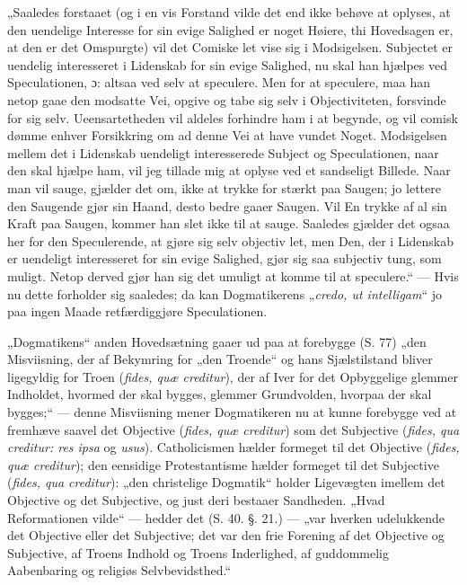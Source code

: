 „Saaledes forstaaet (og i en vis Forstand vilde det end ikke
behøve at oplyses, at den uendelige Interesse for sin evige
Salighed er noget Høiere, thi Hovedsagen er, at den er det
Omspurgte) vil det Comiske let vise sig i Modsigelsen. Subjectet
er uendelig interesseret i Lidenskab for sin evige Salighed, nu
skal han hjælpes ved Speculationen, ɔ: altsaa ved selv at
speculere. Men for at speculere, maa han netop gaae den modsatte
Vei, opgive og tabe sig selv i Objectiviteten, forsvinde for sig
selv. Ueensartetheden vil aldeles forhindre ham i at begynde, og
vil comisk dømme enhver Forsikkring om ad denne Vei at have vundet
Noget. Modsigelsen mellem det i Lidenskab uendeligt interesserede
Subject og Speculationen, naar den skal hjælpe ham, vil jeg
tillade mig at oplyse ved et sandseligt Billede. Naar man vil
sauge, gjælder det om, ikke at trykke for stærkt paa Saugen; jo
lettere den Saugende gjør sin Haand, desto bedre gaaer Saugen. Vil
En trykke af al sin Kraft
 paa Saugen, kommer han slet ikke til at sauge. Saaledes gjælder
det ogsaa her for den Speculerende, at gjøre sig selv objectiv
let, men Den, der i Lidenskab er uendeligt interesseret for sin
evige Salighed, gjør sig saa subjectiv tung, som muligt. Netop
derved gjør han sig det umuligt at komme til at speculere.“ ---
Hvis nu dette forholder sig saaledes; da kan Dogmatikerens
„\textit{credo, ut intelligam}“ jo paa ingen Maade retfærdiggjøre
Speculationen.

„Dogmatikens“ anden Hovedsætning gaaer ud paa at forebygge (S. 77)
„den Misviisning, der af Bekymring for „den Troende“ og hans
Sjælstilstand bliver ligegyldig for Troen (\textit{fides, quæ
creditur}), der af Iver for det Opbyggelige glemmer Indholdet,
hvormed der skal bygges, glemmer Grundvolden, hvorpaa der skal
bygges;“ --- denne Misviisning mener Dogmatikeren nu at kunne
forebygge ved at fremhæve saavel det Objective (\textit{fides,
quæ creditur}) som det Subjective (\textit{fides, qua creditur:
res ipsa} og \textit{usus}). Catholicismen hælder formeget til det
Objective (\textit{fides, quæ creditur}); den eensidige
Protestantisme hælder formeget til det Subjective (\textit{fides,
qua creditur}): „den christelige Dogmatik“ holder Ligevægten
imellem det Objective og det Subjective, og just deri bestaaer
Sandheden. „Hvad Reformationen vilde“ --- hedder det (S. 40.
§. 21.) --- „var hverken udelukkende det Objective eller det
Subjective; det var den frie Forening af det Objective og
Subjective, af Troens Indhold og Troens Inderlighed, af
guddommelig Aabenbaring og religiøs Selvbevidsthed.“

